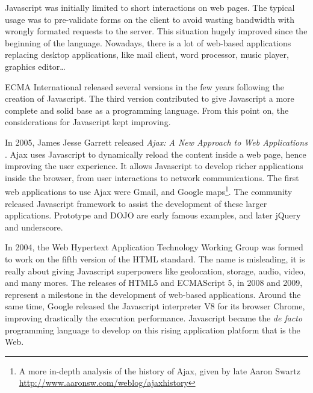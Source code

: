 Javascript was initially limited to short interactions on web pages.
The typical usage was to pre-validate forms on the client to avoid wasting bandwidth with wrongly formated requests to the server.
This situation hugely improved since the beginning of the language.
Nowadays, there is a lot of web-based applications replacing desktop applications, like mail client, word processor, music player, graphics editor\ldots

ECMA International released several versions in the few years following the creation of Javascript.
The third version contributed to give Javascript a more complete and solid base as a programming language.
From this point on, the considerations for Javascript kept improving.

In 2005, James Jesse Garrett released \textit{Ajax: A New Approach to Web Applications} \cite{Garrett2005}.
Ajax uses Javascript to dynamically  reload the content inside a web page, hence improving the user experience.
It allows Javascript to develop richer applications inside the browser, from user interactions to network communications.
The first web applications to use Ajax were Gmail, and Google maps\footnote{A more in-depth analysis of the history of Ajax, given by late Aaron Swartz \url{http://www.aaronsw.com/weblog/ajaxhistory}}.
The community released Javascript framework to assist the development of these larger applications.
Prototype and DOJO are early famous examples, and later jQuery and underscore.


In 2004, the Web Hypertext Application Technology Working Group was formed to work on the fifth version of the HTML standard.
The name is misleading, it is really about giving Javascript superpowers like geolocation, storage, audio, video, and many mores.
The releases of HTML5 and ECMAScript 5, in 2008 and 2009, represent a milestone in the development of web-based applications.
Around the same time, Google released the Javascript interpreter V8 for its browser Chrome, improving drastically the execution performance.
Javascript became the \textit{de facto} programming language to develop on this rising application platform that is the Web.

